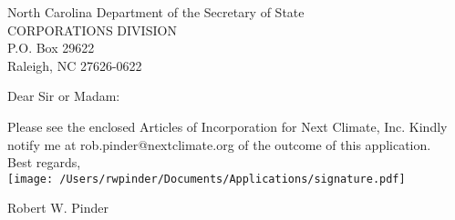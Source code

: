 \documentclass[paper=a4]{scrlttr2}
\begin{document}
\begin{letter}
{North Carolina Department of the Secretary of State\\
CORPORATIONS DIVISION\\
P.O. Box 29622\\
Raleigh, NC 27626-0622}

\opening{Dear Sir or Madam:}

Please see the enclosed Articles of Incorporation for Next Climate,
Inc. Kindly notify me at rob.pinder@nextclimate.org of the outcome of
this application.\\

\vspace{1cm}
\noindent
Best regards,\\
\texttt{[image: /Users/rwpinder/Documents/Applications/signature.pdf]} 

\noindent
Robert W. Pinder\\

\end{letter}
\end{document}
